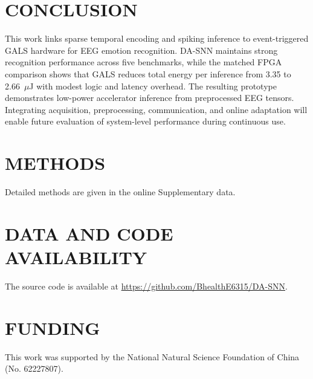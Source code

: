 ﻿\documentclass{nsr}
\begin{document}
\section{CONCLUSION}
This work links sparse temporal encoding and spiking inference to event-triggered GALS hardware for EEG emotion recognition. DA-SNN maintains strong recognition performance across five benchmarks, while the matched FPGA comparison shows that GALS reduces total energy per inference from 3.35 to 2.66~$\mu$J with modest logic and latency overhead. The resulting prototype demonstrates low-power accelerator inference from preprocessed EEG tensors. Integrating acquisition, preprocessing, communication, and online adaptation will enable future evaluation of system-level performance during continuous use.

\section{METHODS}
Detailed methods are given in the online Supplementary data.

\section{DATA AND CODE AVAILABILITY}
The source code is available at \url{https://github.com/BhealthE6315/DA-SNN}.

\section{FUNDING}
This work was supported by the National Natural Science Foundation of China (No. 62227807).



\end{document}
